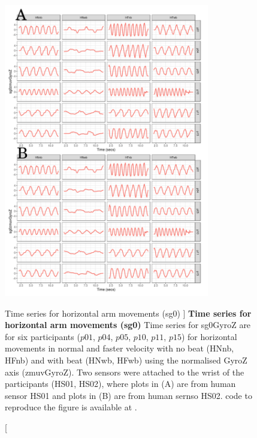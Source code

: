 \begin{figure}
\centering
\includegraphics[width=0.8\textwidth]{ts_H_sg0}
    	\caption
	[Time series for horizontal arm movements (sg0) ]{
	{\bf Time series for horizontal arm movements (sg0)}
		Time series for sg0GyroZ are for six participants 
		($p01$, $p04$, $p05$, $p10$, $p11$, $p15$) 
		for horizontal movements in normal and faster velocity with
		no beat	(HNnb, HFnb) and with beat (HNwb, HFwb) using 
		the normalised GyroZ axis (zmuvGyroZ).
		Two sensors were attached to the wrist of the participants (HS01, HS02),
		where plots in (A) are from human sensor HS01 and
		plots in (B) are from human sernso HS02.
	\R code to reproduce the figure is available at 
	.
        }
    \label{fig:tssg0gyroZ-hii}
\end{figure}


